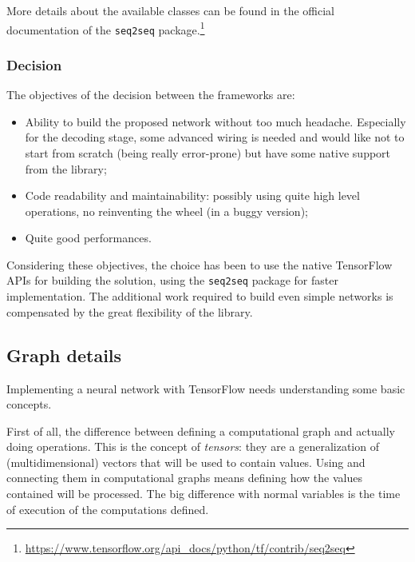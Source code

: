 More details about the available classes can be found in the official documentation of the \texttt{seq2seq} package.\footnote{\url{https://www.tensorflow.org/api\_docs/python/tf/contrib/seq2seq}}

\subsubsection{Decision}
The objectives of the decision between the frameworks are:

\begin{itemize}
	\item Ability to build the proposed network without too much headache. Especially for the decoding stage, some advanced wiring is needed and would like not to start from scratch (being really error-prone) but have some native support from the library;
	\item Code readability and maintainability: possibly using quite high level operations, no reinventing the wheel (in a buggy version);
	\item Quite good performances.
\end{itemize}
Considering these objectives, the choice has been to use the native TensorFlow APIs for building the solution, using the \texttt{seq2seq} package for faster implementation. The additional work required to build even simple networks is compensated by the great flexibility of the library.

\subsection{Graph details}
\label{implementationNNDetails}

Implementing a neural network with TensorFlow needs understanding some basic concepts.

First of all, the difference between defining a computational graph and actually doing operations. This is the concept of \textit{tensors}: they are a generalization of (multidimensional) vectors that will be used to contain values. Using and connecting them in computational graphs means defining how the values contained will be processed. The big difference with normal variables is the time of execution of the computations defined.

